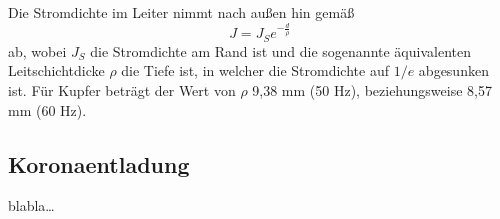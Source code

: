Die Stromdichte im Leiter nimmt nach außen hin gemäß
\begin{equation}
J = J_S e^{-\frac{d}{\rho}}
\end{equation}
ab, wobei $J_S$ die Stromdichte am Rand ist und die sogenannte äquivalenten Leitschichtdicke $\rho$ die Tiefe ist, in welcher die Stromdichte auf $1/e$ abgesunken ist. Für Kupfer beträgt der Wert von $\rho$ 9,38 mm (50 Hz), beziehungsweise 8,57 mm (60 Hz).

\subsection{Koronaentladung}
blabla…
